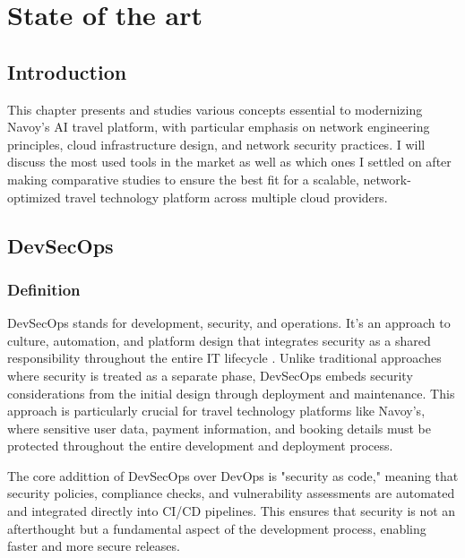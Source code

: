 \chapter{State of the art}
\minitoc
\newpage

\setcounter{secnumdepth}{0} %
\section{Introduction}
This chapter presents and studies various concepts essential to modernizing Navoy's AI travel platform, with particular emphasis on network engineering principles, cloud infrastructure design, and network security practices.
I will discuss the most used tools in the market as well as which ones I settled on after making comparative studies to ensure the best fit for a scalable, network-optimized travel technology platform across multiple cloud providers.

\setcounter{secnumdepth}{2} %
\section{DevSecOps}

\subsection{Definition}
DevSecOps stands for development, security, and operations. It's an approach to culture, automation, and platform design that integrates security as a shared responsibility throughout the entire IT lifecycle \cite{redhat-devsecops}. Unlike traditional approaches where security is treated as a separate phase, DevSecOps embeds security considerations from the initial design through deployment and maintenance. This approach is particularly crucial for travel technology platforms like Navoy's, where sensitive user data, payment information, and booking details must be protected throughout the entire development and deployment process.

The core addittion of DevSecOps over DevOps is "security as code," meaning that security policies, compliance checks, and vulnerability assessments are automated and integrated directly into CI/CD pipelines. This ensures that security is not an afterthought but a fundamental aspect of the development process, enabling faster and more secure releases.

